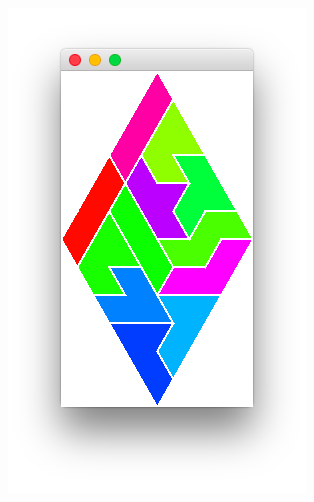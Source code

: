 \documentclass[a4paper,12pt]{article}
\begin{document}
\begin{figure}[h!]
\begin{subfigure}{0.2\textwidth}
		\includegraphics[width=\textwidth]{figures/task10_3.png}
		\caption{}
	\end{subfigure}
	\begin{subfigure}{0.3\textwidth}

\end{subfigure}
\end{figure}
\end{document}
